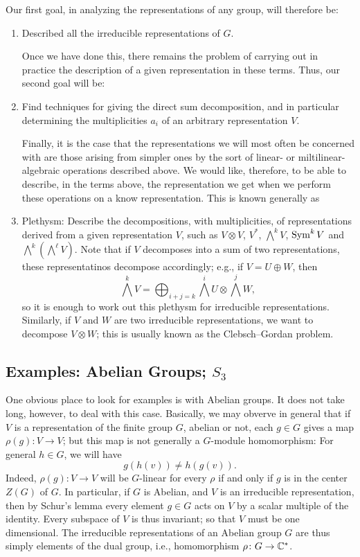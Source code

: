 Our first goal, in analyzing the representations of any group, will
therefore be:
\begin{enumerate}[label=(\alph*)]
\item Described all the irreducible representations of $G$.

  Once we have done this, there remains the problem of carrying out in
  practice the description of a given representation in these terms. Thus,
  our second goal will be:
\item Find techniques for giving the direct sum decomposition, and in
  particular determining the multiplicities $a_i$ of an arbitrary
  representation $V$.

  Finally, it is the case that the representations we will most often be
  concerned with are those arising from simpler ones by the sort of linear-
  or miltilinear-algebraic operations described above. We would like,
  therefore, to be able to describe, in the terms above, the representation
  we get when we perform these operations on a know representation. This is
  known generally as
\item Plethysm: Describe the decompositions, with multiplicities, of
  representations derived from a given representation $V$, such as
  $V\otimes V$, $V^*$, $\bigwedge^k V$, $\operatorname{Sym}^k V$ and
  $\bigwedge^k(\bigwedge^\ell V)$. Note that if $V$ decomposes into a sum
  of two representations, these representatinos decompose accordingly;
  e.g., if $V=U\oplus W$, then
  \[
    \bigwedge^k V=\bigoplus_{i+j=k}\bigwedge^i U\otimes\bigwedge^j W,
  \]
  so it is enough to work out this plethysm for irreducible
  representations. Similarly, if $V$ and $W$ are two irreducible
  representations, we want to decompose $V\otimes W$; this is usually known
  as the Clebsch--Gordan problem.
\end{enumerate}
\subsection{Examples: Abelian Groups; $S_3$}
One obvious place to look for examples is with Abelian groups. It does not
take long, however, to deal with this case. Basically, we may obverve in
general that if $V$ is a representation of the finite group $G$, abelian or
not, each $g\in G$ gives a map $\rho(g)\colon V\to V$; but this map is not
generally a $G$-module homomorphism: For general $h\in G$, we will have
\[
g(h(v))\neq h(g(v)).
\]
Indeed, $\rho(g)\colon V\to V$ will be $G$-linear for every $\rho$ if and
only if $g$ is in the center $Z(G)$ of $G$. In particular, if $G$ is
Abelian, and $V$ is an irreducible representation, then by Schur's lemma
every element $g\in G$ acts on $V$ by a scalar multiple of the
identity. Every subspace of $V$ is thus invariant; so that $V$ must be one
dimensional. The irreducible representations of an Abelian group $G$ are
thus simply elements of the dual group, i.e., homomorphism $\rho\colon
G\to\mathbb{C}^*$.

